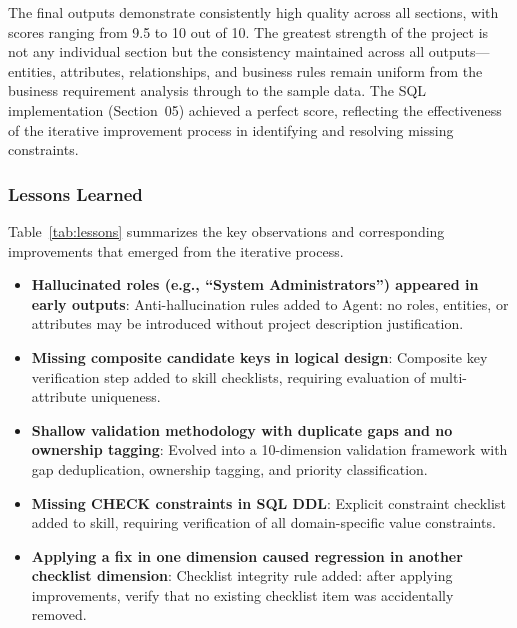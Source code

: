 The final outputs demonstrate consistently high quality across all sections, with scores ranging from 9.5 to 10 out of 10. The greatest strength of the project is not any individual section but the consistency maintained across all outputs---entities, attributes, relationships, and business rules remain uniform from the business requirement analysis through to the sample data. The SQL implementation (Section~05) achieved a perfect score, reflecting the effectiveness of the iterative improvement process in identifying and resolving missing constraints.

\subsubsection{Lessons Learned}

Table~\ref{tab:lessons} summarizes the key observations and corresponding improvements that emerged from the iterative process.

\begin{itemize}
    \item \textbf{Hallucinated roles (e.g., ``System Administrators'') appeared in early outputs}: Anti-hallucination rules added to Agent: no roles, entities, or attributes may be introduced without project description justification.
    \item \textbf{Missing composite candidate keys in logical design}: Composite key verification step added to skill checklists, requiring evaluation of multi-attribute uniqueness.
    \item \textbf{Shallow validation methodology with duplicate gaps and no ownership tagging}: Evolved into a 10-dimension validation framework with gap deduplication, ownership tagging, and priority classification.
    \item \textbf{Missing CHECK constraints in SQL DDL}: Explicit constraint checklist added to skill, requiring verification of all domain-specific value constraints.
    \item \textbf{Applying a fix in one dimension caused regression in another checklist dimension}: Checklist integrity rule added: after applying improvements, verify that no existing checklist item was accidentally removed.
\end{itemize}
